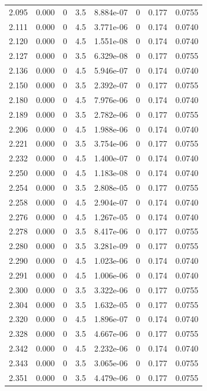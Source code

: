 \documentclass[preview]{standalone}
\begin{document}
{{{{{\begin{tabular}{L{1.2cm}C{1.2cm} C{0.3cm}C{0.5cm} C{1.4cm}C{1.4cm} C{1.4cm}C{1.4cm}}
  2.095  &  0.000  & 0     & 3.5 &  8.884e-07  & 0  & 0.177 &  0.0755   \\ 
  2.111  &  0.000  & 0     & 4.5 &  3.771e-06  & 0  & 0.174 &  0.0740   \\ 
  2.120  &  0.000  & 0     & 4.5 &  1.551e-08  & 0  & 0.174 &  0.0740   \\ 
  2.127  &  0.000  & 0     & 3.5 &  6.329e-08  & 0  & 0.177 &  0.0755   \\ 
  2.136  &  0.000  & 0     & 4.5 &  5.946e-07  & 0  & 0.174 &  0.0740   \\ 
  2.150  &  0.000  & 0     & 3.5 &  2.392e-07  & 0  & 0.177 &  0.0755   \\ 
  2.180  &  0.000  & 0     & 4.5 &  7.976e-06  & 0  & 0.174 &  0.0740   \\ 
  2.189  &  0.000  & 0     & 3.5 &  2.782e-06  & 0  & 0.177 &  0.0755   \\ 
  2.206  &  0.000  & 0     & 4.5 &  1.988e-06  & 0  & 0.174 &  0.0740   \\ 
  2.221  &  0.000  & 0     & 3.5 &  3.754e-06  & 0  & 0.177 &  0.0755   \\ 
  2.232  &  0.000  & 0     & 4.5 &  1.400e-07  & 0  & 0.174 &  0.0740   \\ 
  2.250  &  0.000  & 0     & 4.5 &  1.183e-08  & 0  & 0.174 &  0.0740   \\ 
  2.254  &  0.000  & 0     & 3.5 &  2.808e-05  & 0  & 0.177 &  0.0755   \\ 
  2.258  &  0.000  & 0     & 4.5 &  2.904e-07  & 0  & 0.174 &  0.0740   \\ 
  2.276  &  0.000  & 0     & 4.5 &  1.267e-05  & 0  & 0.174 &  0.0740   \\ 
  2.278  &  0.000  & 0     & 3.5 &  8.417e-06  & 0  & 0.177 &  0.0755   \\ 
  2.280  &  0.000  & 0     & 3.5 &  3.281e-09  & 0  & 0.177 &  0.0755   \\ 
  2.290  &  0.000  & 0     & 4.5 &  1.023e-06  & 0  & 0.174 &  0.0740   \\ 
  2.291  &  0.000  & 0     & 4.5 &  1.006e-06  & 0  & 0.174 &  0.0740   \\ 
  2.300  &  0.000  & 0     & 3.5 &  3.322e-06  & 0  & 0.177 &  0.0755   \\ 
  2.304  &  0.000  & 0     & 3.5 &  1.632e-05  & 0  & 0.177 &  0.0755   \\ 
  2.320  &  0.000  & 0     & 4.5 &  1.896e-07  & 0  & 0.174 &  0.0740   \\ 
  2.328  &  0.000  & 0     & 3.5 &  4.667e-06  & 0  & 0.177 &  0.0755   \\ 
  2.342  &  0.000  & 0     & 4.5 &  2.232e-06  & 0  & 0.174 &  0.0740   \\ 
  2.343  &  0.000  & 0     & 3.5 &  3.065e-06  & 0  & 0.177 &  0.0755   \\ 
  2.351  &  0.000  & 0     & 3.5 &  4.479e-06  & 0  & 0.177 &  0.0755   \\ 
\hline 
\end{tabular} 

}}}}}
\end{document}
